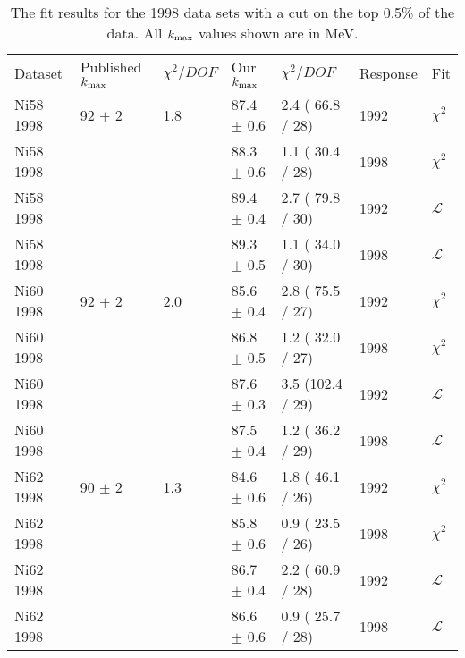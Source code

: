 \begin{table}[h]
  \begin{center}
    \begin{tabular}{|l||l|l|l|l|l|l|}
      \hline
      Dataset & Published $\mbox{$k_{\rm max}$}$ & $\chi^2 / DOF$ & Our $\mbox{$k_{\rm max}$}$ & $\chi^2 / DOF$  & Response & Fit \\
      \hhline{|=||=|=|=|=|=|=|}

      Ni58 1998 & 92   $\pm$ 2   & 1.8 & 87.4 $\pm$ 0.6 & 2.4 ( 66.8 / 28) & 1992 & $\chi^2$ \\
      Ni58 1998 &                &     & 88.3 $\pm$ 0.6 & 1.1 ( 30.4 / 28) & 1998 & $\chi^2$ \\
      Ni58 1998 &                &     & 89.4 $\pm$ 0.4 & 2.7 ( 79.8 / 30) & 1992 & $\mathcal{L}$ \\
      Ni58 1998 &                &     & 89.3 $\pm$ 0.5 & 1.1 ( 34.0 / 30) & 1998 & $\mathcal{L}$ \\
      \hline                           
      Ni60 1998 & 92   $\pm$ 2   & 2.0 & 85.6 $\pm$ 0.4 & 2.8 ( 75.5 / 27) & 1992 & $\chi^2$ \\
      Ni60 1998 &                &     & 86.8 $\pm$ 0.5 & 1.2 ( 32.0 / 27) & 1998 & $\chi^2$ \\
      Ni60 1998 &                &     & 87.6 $\pm$ 0.3 & 3.5 (102.4 / 29) & 1992 & $\mathcal{L}$ \\
      Ni60 1998 &                &     & 87.5 $\pm$ 0.4 & 1.2 ( 36.2 / 29) & 1998 & $\mathcal{L}$ \\
      \hline                           
      Ni62 1998 & 90   $\pm$ 2   & 1.3 & 84.6 $\pm$ 0.6 & 1.8 ( 46.1 / 26) & 1992 & $\chi^2$ \\
      Ni62 1998 &                &     & 85.8 $\pm$ 0.6 & 0.9 ( 23.5 / 26) & 1998 & $\chi^2$ \\
      Ni62 1998 &                &     & 86.7 $\pm$ 0.4 & 2.2 ( 60.9 / 28) & 1992 & $\mathcal{L}$ \\
      Ni62 1998 &                &     & 86.6 $\pm$ 0.6 & 0.9 ( 25.7 / 28) & 1998 & $\mathcal{L}$ \\
      \hline                           
    \end{tabular}
  \end{center}
  \caption{The fit results for the 1998 data sets with a cut on the top 0.5\% of the data. All $\mbox{$k_{\rm max}$}$ values shown are in MeV.}
  \label{table:fits1998}
\end{table}

